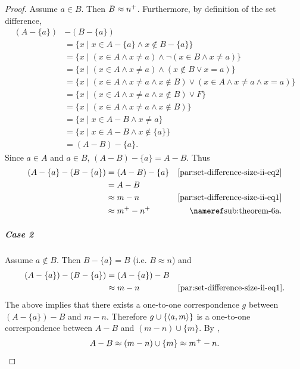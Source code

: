 \documentclass{report}
\begin{document}
\begin{proof}
        Assume $a \in B$.
        Then $B \approx n^+$.
        Furthermore, by definition of the set difference,
          \begin{align}
            (A - \{a\}) & - (B - \{a\}) \nonumber \\
              & = \{x \mid
                x \in A - \{a\} \land x \not\in B - \{a\}\} \nonumber \\
              & = \{x \mid
                (x \in A \land x \neq a) \land
                \neg(x \in B \land x \neq a)\} \nonumber \\
              & = \{x \mid
                (x \in A \land x \neq a) \land
                (x \not\in B \lor x = a)\} \nonumber \\
              & = \{x \mid
                (x \in A \land x \neq a \land x \not\in B) \lor
                (x \in A \land x \neq a \land x = a)\} \nonumber \\
              & = \{x \mid
                (x \in A \land x \neq a \land x \not\in B) \lor F\} \nonumber \\
              & = \{x \mid
                (x \in A \land x \neq a \land x \not\in B)\} \nonumber \\
              & = \{x \mid x \in A - B \land x \neq a\} \nonumber \\
              & = \{x \mid x \in A - B \land x \not\in \{a\}\} \nonumber \\
              & = (A - B) - \{a\}.
                \label{par:set-difference-size-ii-eq2}
          \end{align}
        Since $a \in A$ and $a \in B$, $(A - B) - \{a\} = A - B$.
        Thus
          \begin{align*}
            (A - \{a\} - (B - \{a\})
              & = (A - B) - \{a\} & \eqref{par:set-difference-size-ii-eq2} \\
              & = A - B \\
              & \equin m - n & \eqref{par:set-difference-size-ii-eq1} \\
              & \equin m^+ - n^+ & \textref{sub:theorem-6a}.
          \end{align*}

      \subparagraph{Case 2}%

        Assume $a \not\in B$.
        Then $B - \{a\} = B$ (i.e. $B \approx n$) and
          \begin{align*}
            (A - \{a\}) - (B - \{a\})
              & = (A - \{a\}) - B \\
              & \approx m - n & \eqref{par:set-difference-size-ii-eq1}.
          \end{align*}
        The above implies that there exists a one-to-one correspondence $g$
          between $(A - \{a\}) - B$ and $m - n$.
        Therefore $g \cup \{\left< a, m \right>\}$ is a one-to-one correspondence
          between $A - B$ and $(m - n) \cup \{m\}$.
        By ,
          $$A - B \approx (m - n) \cup \{m\} \approx m^+ - n.$$


\end{proof}
\end{document}
